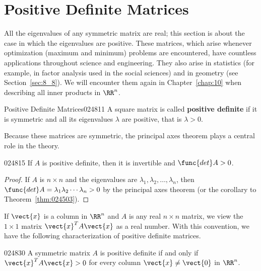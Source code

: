 \section{Positive Definite Matrices}
\label{sec:8_3}

All the eigenvalues of any symmetric 
matrix are real; this section is about the case in which the eigenvalues
 are positive. These matrices, which arise whenever optimization 
(maximum and minimum) problems are encountered, have countless 
applications throughout science and engineering. They also arise in 
statistics (for example, in factor analysis used in the social sciences)
 and in geometry (see Section~\ref{sec:8_8}). We will encounter them again in Chapter~\ref{chap:10} when describing all inner products in $\RR^n$.


\begin{definition}{Positive Definite Matrices}{024811}
A square matrix is called \textbf{positive definite} if it is symmetric and all its eigenvalues $\lambda$ are positive, that is $\lambda > 0$.
\end{definition}

Because these matrices are symmetric, the principal axes theorem plays a central role in the theory.


\begin{theorem}{}{024815}
If $A$ is positive definite, then it is invertible and $\func{det}A > 0$.
\end{theorem}

\begin{proof}
If $A$ is $n \times n$ and the eigenvalues are $\lambda_{1}, \lambda_{2}, \dots, \lambda_{n}$, then $\func{det}A = \lambda_{1}\lambda_{2} \cdots \lambda_{n} > 0$ by the principal axes theorem (or the corollary to Theorem~\ref{thm:024503}).
\end{proof}

If $\vect{x}$ is a column in $\RR^n$ and $A$ is any real $n \times n$ matrix, we view the $1 \times 1$ matrix $\vect{x}^{T}A\vect{x}$ as a real number. With this convention, we have the following characterization of positive definite matrices.


\begin{theorem}{}{024830}
A symmetric matrix $A$ is positive definite if and only if $\vect{x}^{T} A \vect{x} > 0$ for every column $\vect{x} \neq \vect{0}$ in $\RR^n$.
\end{theorem}

